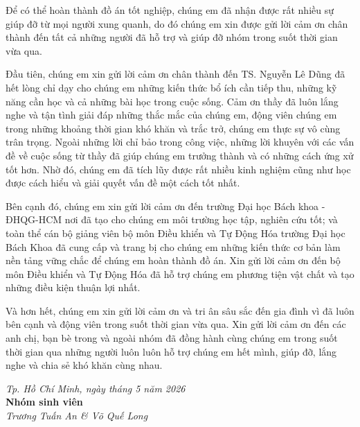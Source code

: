 \documentclass[13pt,a4paper,oneside]{extbook}
\begin{document}
\begin{acknowledgments}

	Để có thể hoàn thành đồ án tốt nghiệp, chúng em đã nhận được rất nhiều sự giúp đỡ từ mọi người xung quanh, do đó chúng em xin được gửi lời cảm ơn chân thành đến tất cả những người đã hỗ trợ và giúp đỡ nhóm trong suốt thời gian vừa qua.
    
    Đầu tiên, chúng em xin gửi lời cảm ơn chân thành đến TS. Nguyễn Lê Dũng đã hết lòng chỉ dạy cho chúng em những kiến thức bổ ích cần tiếp thu, những kỹ năng cần học và cả những bài học trong cuộc sống. Cảm ơn thầy đã luôn lắng nghe và tận tình giải đáp những thắc mắc của chúng em, động viên chúng em trong những khoảng thời gian khó khăn và trắc trở, chúng em thực sự vô cùng trân trọng. Ngoài những lời chỉ bảo trong công việc, những lời khuyên với các vấn đề về cuộc sống từ thầy đã giúp chúng em trưởng thành và có những cách ứng xử tốt hơn. Nhờ đó, chúng em đã tích lũy được rất nhiều kinh nghiệm cũng như học được cách hiểu và giải quyết vấn đề một cách tốt nhất.
    
    Bên cạnh đó, chúng em xin gửi lời cảm ơn đến trường Đại học Bách khoa - ĐHQG-HCM nơi đã tạo cho chúng em môi trường học tập, nghiên cứu tốt; và toàn thể cán bộ giảng viên bộ môn Điều khiển và Tự Động Hóa trường Đại học Bách Khoa đã cung cấp và trang bị cho chúng em những kiến thức cơ bản làm nền tảng vững chắc để chúng em hoàn thành đồ án. Xin gửi lời cảm ơn đến bộ môn Điều khiển và Tự Động Hóa đã hỗ trợ chúng em phương tiện vật chất và tạo những điều kiện thuận lợi nhất.

    Và hơn hết, chúng em xin gửi lời cảm ơn và tri ân sâu sắc đến gia đình vì đã luôn bên cạnh và động viên trong suốt thời gian vừa qua. Xin gửi lời cảm ơn đến các anh chị, bạn bè trong và ngoài nhóm đã đồng hành cùng chúng em trong suốt thời gian qua những người luôn luôn hỗ trợ chúng em hết mình, giúp đỡ, lắng nghe và chia sẻ khó khăn cùng nhau. 
    
   \vspace{1.5cm}
    \begin{flushright}
        \textit{Tp. Hồ Chí Minh, ngày \hspace{0.7cm} tháng 5 năm 2026} \\[0.2cm]
        \textbf{Nhóm sinh viên} \\[0.2cm]
        \textit{Trương Tuấn An \& Võ Quế Long}
    \end{flushright}

	
\end{acknowledgments}
	
\end{document}
